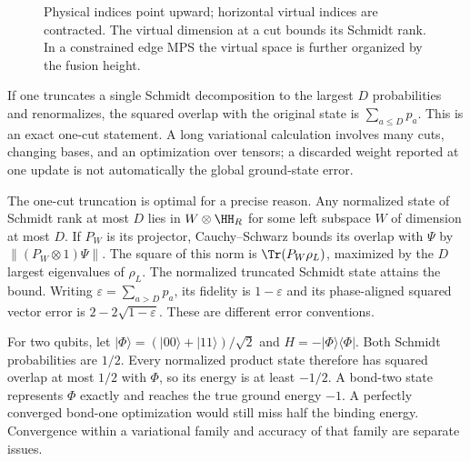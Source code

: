 \begin{figure}[htbp]
\centering
{}
\caption{Physical indices point upward; horizontal virtual indices are
contracted. The virtual dimension at a cut bounds its Schmidt rank.
In a constrained edge MPS the virtual space is further organized by
the fusion height.}
\label{fig:MPS-cut}
\end{figure}

If one truncates a single Schmidt decomposition to the largest $D$
probabilities and renormalizes, the squared overlap with the original
state is $\sum_{a\leq D}p_a$. This is an exact one-cut statement. A long
variational calculation involves many cuts, changing bases, and an
optimization over tensors; a discarded weight reported at one update
is not automatically the global ground-state error.

The one-cut truncation is optimal for a precise reason. Any normalized
state of Schmidt rank at most $D$ lies in $W\otimes\HH_R$ for
some left subspace $W$ of dimension at most $D$. If $P_W$ is its
projector, Cauchy--Schwarz bounds its overlap with $\Psi$ by
$\|(P_W\otimes1)\Psi\|$. The square of this norm is
$\Tr(P_W\rho_L)$, maximized by the $D$ largest eigenvalues of
$\rho_L$. The normalized truncated Schmidt state attains the bound.
Writing $\varepsilon=\sum_{a>D}p_a$, its fidelity is $1-\varepsilon$
and its phase-aligned squared vector error is
$2-2\sqrt{1-\varepsilon}$. These are different error conventions.

\begin{example}
For two qubits, let
$|\Phi\rangle=(|00\rangle+|11\rangle)/\sqrt2$ and
$H=-|\Phi\rangle\langle\Phi|$. Both Schmidt probabilities are
$1/2$. Every normalized product state therefore has squared overlap
at most $1/2$ with $\Phi$, so its energy is at least $-1/2$.
A bond-two state represents $\Phi$ exactly and reaches the true
ground energy $-1$. A perfectly converged bond-one optimization
would still miss half the binding energy. Convergence within a
variational family and accuracy of that family are separate issues.
\end{example}

